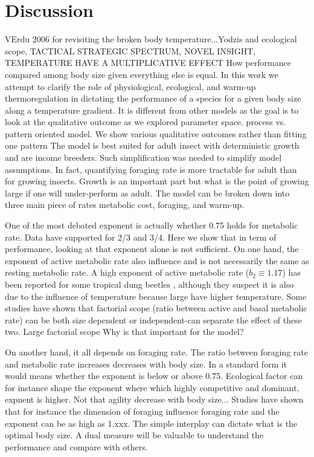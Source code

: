 \section*{Discussion}

VErdu 2006 for revisiting the broken body temperature...Yodzis and ecological scope, TACTICAL STRATEGIC SPECTRUM, NOVEL INSIGHT, TEMPERATURE HAVE A MULTIPLICATIVE EFFECT
How performance compared among body size given everything else is equal.
In this work we attempt to clarify the role of  physiological, ecological, and warm-up thermoregulation in dictating the performance of a species for a given body size along a temperature gradient.
It is different from other models as the goal is to look at the qualitative outcome as we explored parameter space. process vs. pattern oriented model.
We show various qualitative outcomes rather than fitting one pattern
The model is best suited for adult insect with deterministic growth and are income breeders.  
Such simplification was needed to simplify model assumptions.
In fact, quantifying foraging rate is more tractable for adult than for growing insects.
Growth is an important part but what is the point of growing large if one will under-perform as adult.
The model can be broken down into three main piece of rates  metabolic cost, foraging, and warm-up.

One of the most debated exponent is actually whether 0.75 holds for metabolic rate.
Data have supported for 2/3 and 3/4. 
Here we show that in term of performance, looking at that exponent alone is not sufficient.
On one hand, the exponent of active metabolic rate also influence and is not necessarily the same as resting metabolic rate.
A high exponent of active metabolic rate ($b_2 \equiv 1.17$) has been reported for some tropical dung beetles \citep{Bartholomew1978}, although they suspect it is also due to the influence of temperature because large have higher temperature. 
Some studies have shown that factorial scope (ratio between active and basal metabolic rate) can be both size dependent or independent-can separate the effect of these two.
Large factorial scope
Why is that important for the model?
    
On another hand, it all depends on foraging rate.
The ratio between foraging rate and metabolic rate increases decreases with body size.
In a standard form it would means whether the exponent is below or above 0.75.
Ecological factor can for instance shape the exponent where which highly competitive and dominant, expnent is higher.
Not that agility decrease with body size...
Studies have shown that for instance the dimension of foraging influence foraging rate and the exponent can be as high as 1.xxx.
The simple interplay can dictate what is the optimal body size.
A dual measure will be valuable to understand the performance and compare with others.

